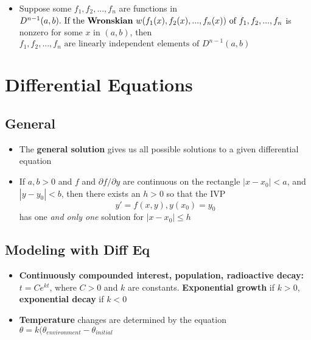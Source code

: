 \documentclass[10pt,letterpaper]{article}
\begin{document}
\begin{itemize}
\item Suppose some $f_1, f_2,...,f_n$ are functions in $D^{n-1}(a,b).\mbox{ If the \textbf{Wronskian} }w(f_1(x),f_2(x),...,f_n(x)) \mbox{ of } f_1,f_2,...,f_n$
is nonzero for some $x$ in $(a,b)$, then $f_1, f_2, ...,f_n \mbox{ are linearly independent elements of }D^{n-1}(a,b)$

\end{itemize}


\section*{Differential Equations}

\subsection*{General}
\begin{itemize}

\item The \textbf{general solution} gives us all possible solutions to a given differential equation

\item If $a,b>0$ and $f$ and $\partial f/\partial y$ are continuous on the rectangle $|x-x_0|<a$, 
and $|y-y_0|<b$, then there exists an $h>0$ so that the IVP 
$$y'=f(x,y), y(x_0)=y_0$$
has one \textit{and only one} solution for $|x-x_0|\leq h$

\end{itemize}

\subsection*{Modeling with Diff Eq}

\begin{itemize}
\item \textbf{Continuously compounded interest, population, radioactive decay:} 
$t=Ce^{kt}$, where $C>0$ and $k$ are constants. \textbf{Exponential growth} if $k>0$, \textbf{exponential decay} if $k<0$

\item \textbf{Temperature} changes are determined by the equation 
$\theta = k(\theta_{environment} - \theta_{initial}$

\end{itemize}
\end{document}
